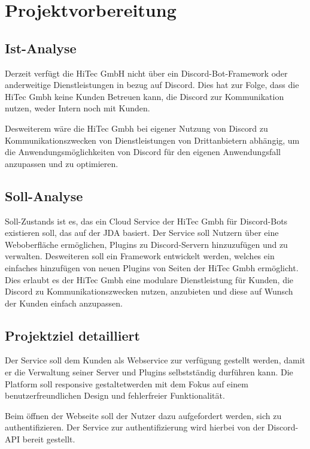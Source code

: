 
\section{Projektvorbereitung}\label{projektvorbereitung}

\subsection{Ist-Analyse}\label{ist-analyse}
Derzeit verfügt die HiTec GmbH nicht über ein Discord-Bot-Framework oder anderweitige Dienstleistungen in bezug auf Discord. Dies hat zur Folge, dass die HiTec Gmbh keine Kunden Betreuen kann, die Discord zur Kommunikation nutzen, weder Intern noch mit Kunden.

Desweiterem wäre die HiTec Gmbh bei eigener Nutzung von Discord zu Kommunikationszwecken von Dienstleistungen von Drittanbietern abhängig, um die Anwendungsmöglichkeiten von Discord für den eigenen Anwendungsfall anzupassen und zu optimieren.

\subsection{Soll-Analyse}\label{soll-analyse}
Soll-Zustands ist es, das ein Cloud Service der HiTec Gmbh für Discord-Bots existieren soll, das auf der \gls{JDA} \autocite{jda-github,jda-wiki} basiert. Der Service soll  Nutzern über eine Weboberfläche ermöglichen, Plugins zu Discord-Servern hinzuzufügen und zu verwalten. Desweiteren soll ein Framework entwickelt werden, welches ein einfaches hinzufügen von neuen Plugins von Seiten der HiTec Gmbh ermöglicht. Dies erlaubt es der HiTec Gmbh eine modulare Dienstleistung für Kunden, die Discord zu Kommunikationszwecken nutzen, anzubieten und diese auf Wunsch der Kunden einfach anzupassen. 

\subsection{Projektziel detailliert}\label{projektziel-detailliert}
Der Service soll dem Kunden als Webservice zur verfügung gestellt werden, damit er die Verwaltung seiner Server und Plugins selbstständig durführen kann. Die Platform soll responsive gestaltetwerden mit dem Fokus auf einem benutzerfreundlichen Design und fehlerfreier Funktionalität. 

Beim öffnen der Webseite soll der Nutzer dazu aufgefordert werden, sich zu authentifizieren. Der Service zur authentifizierung wird hierbei von der Discord-API bereit gestellt.

